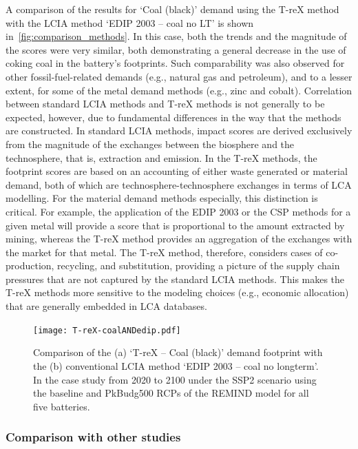 \documentclass[a4paper,fleqn]{cas-dc}
\begin{document}
	A comparison of the results for `Coal (black)' demand using the T-reX method
	with the LCIA method `EDIP 2003 – coal no LT' is shown
	in~\autoref{fig:comparison_methods}. In this case, both the trends and the
	magnitude of the scores were very similar, both demonstrating a general
	decrease in the use of coking coal in the battery's footprints. Such
	comparability was also observed for other fossil-fuel-related demands (e.g.,
	natural gas and petroleum), and to a lesser extent, for some of the metal
	demand methods (e.g., zinc and cobalt). Correlation between standard LCIA
	methods and T-reX methods is not generally to be expected, however, due to
	fundamental differences in the way that the methods are constructed. In
	standard LCIA methods, impact scores are derived exclusively from the magnitude
	of the exchanges between the biosphere and the technosphere, that is,
	extraction and emission. In the T-reX methods, the footprint scores are based
	on an accounting of either waste generated or material demand, both of which
	are technosphere-technosphere exchanges in terms of LCA modelling. For the
	material demand methods especially, this distinction is critical. For example,
	the application of the EDIP 2003 or the CSP methods for a given metal will
	provide a score that is proportional to the amount extracted by mining, whereas
	the T-reX method provides an aggregation of the exchanges with the market for
	that metal. The T-reX method, therefore, considers cases of co-production,
	recycling, and substitution, providing a picture of the supply chain pressures
	that are not captured by the standard LCIA methods. This makes the T-reX
	methods more sensitive to the modeling choices (e.g., economic allocation) that
	are generally embedded in LCA databases.
	
	\begin{figure}[!htbp]
		\centering
		\texttt{[image: T-reX-coalANDedip.pdf]}
		\caption{Comparison of the (a) `T-reX – Coal (black)' demand footprint with the (b) conventional LCIA method `EDIP 2003 – coal no longterm'. In the case study from 2020 to 2100 under the SSP2 scenario using the baseline and PkBudg500 RCPs of the REMIND model for all five batteries.}\label{fig:comparison_methods}
	\end{figure}
	
	\subsubsection{Comparison with other studies}\label{sec:results-case_study-comparison}
	
\end{document}
